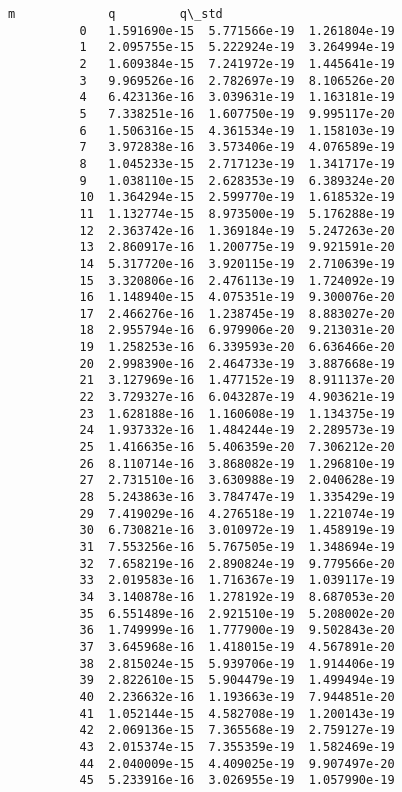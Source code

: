 \documentclass[11pt]{article}
\begin{document}
\begin{Verbatim}[commandchars=\\\{\}]
                         m             q         q\_std  
          0   1.591690e-15  5.771566e-19  1.261804e-19  
          1   2.095755e-15  5.222924e-19  3.264994e-19  
          2   1.609384e-15  7.241972e-19  1.445641e-19  
          3   9.969526e-16  2.782697e-19  8.106526e-20  
          4   6.423136e-16  3.039631e-19  1.163181e-19  
          5   7.338251e-16  1.607750e-19  9.995117e-20  
          6   1.506316e-15  4.361534e-19  1.158103e-19  
          7   3.972838e-16  3.573406e-19  4.076589e-19  
          8   1.045233e-15  2.717123e-19  1.341717e-19  
          9   1.038110e-15  2.628353e-19  6.389324e-20  
          10  1.364294e-15  2.599770e-19  1.618532e-19  
          11  1.132774e-15  8.973500e-19  5.176288e-19  
          12  2.363742e-16  1.369184e-19  5.247263e-20  
          13  2.860917e-16  1.200775e-19  9.921591e-20  
          14  5.317720e-16  3.920115e-19  2.710639e-19  
          15  3.320806e-16  2.476113e-19  1.724092e-19  
          16  1.148940e-15  4.075351e-19  9.300076e-20  
          17  2.466276e-16  1.238745e-19  8.883027e-20  
          18  2.955794e-16  6.979906e-20  9.213031e-20  
          19  1.258253e-16  6.339593e-20  6.636466e-20  
          20  2.998390e-16  2.464733e-19  3.887668e-19  
          21  3.127969e-16  1.477152e-19  8.911137e-20  
          22  3.729327e-16  6.043287e-19  4.903621e-19  
          23  1.628188e-16  1.160608e-19  1.134375e-19  
          24  1.937332e-16  1.484244e-19  2.289573e-19  
          25  1.416635e-16  5.406359e-20  7.306212e-20  
          26  8.110714e-16  3.868082e-19  1.296810e-19  
          27  2.731510e-16  3.630988e-19  2.040628e-19  
          28  5.243863e-16  3.784747e-19  1.335429e-19  
          29  7.419029e-16  4.276518e-19  1.221074e-19  
          30  6.730821e-16  3.010972e-19  1.458919e-19  
          31  7.553256e-16  5.767505e-19  1.348694e-19  
          32  7.658219e-16  2.890824e-19  9.779566e-20  
          33  2.019583e-16  1.716367e-19  1.039117e-19  
          34  3.140878e-16  1.278192e-19  8.687053e-20  
          35  6.551489e-16  2.921510e-19  5.208002e-20  
          36  1.749999e-16  1.777900e-19  9.502843e-20  
          37  3.645968e-16  1.418015e-19  4.567891e-20  
          38  2.815024e-15  5.939706e-19  1.914406e-19  
          39  2.822610e-15  5.904479e-19  1.499494e-19  
          40  2.236632e-16  1.193663e-19  7.944851e-20  
          41  1.052144e-15  4.582708e-19  1.200143e-19  
          42  2.069136e-15  7.365568e-19  2.759127e-19  
          43  2.015374e-15  7.355359e-19  1.582469e-19  
          44  2.040009e-15  4.409025e-19  9.907497e-20  
          45  5.233916e-16  3.026955e-19  1.057990e-19  
\end{Verbatim}
            
\end{document}
